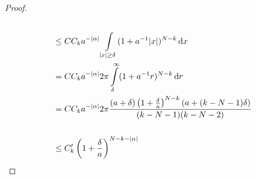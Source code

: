\begin{proof}
\begin{align*}
        \\ &\leq
        C C_k a^{-|\alpha|}
        \int \limits_{|x| \geq \delta}
        (1+a^{-1}|x|)^{N-k} \mathop{}\!\mathrm{d} x
        \\ &=
        C C_k a^{-|\alpha|} 2 \pi
        \int\limits_\delta^\infty
        (1+a^{-1}r)^{N-k} \mathop{}\!\mathrm{d} r
        \\ &=
        C C_k a^{-|\alpha|} 2 \pi
        \frac{(a+\delta)\left(1+\frac{\delta}{a}\right)^{N-k}(a+(k-N-1)\delta)}{(k-N-1)(k-N-2)}\\
        \\ &\leq
        C'_k\left(1+\frac{\delta}{a}\right)^{N-k-|\alpha|}
    \end{align*}

\end{proof}
